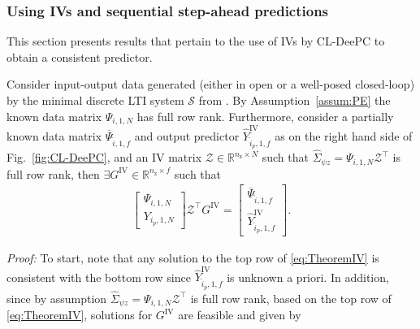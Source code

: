 \subsubsection{Using \ac{IVs} and sequential step-ahead predictions}\label{sec:Theorem1}
\noindent This section presents results that pertain to the use of \ac{IVs} by \ac{CL-DeePC} to obtain a consistent predictor.%
%
\setcounter{thm}{0}
\begin{lem}\label{lem:main_1}
    Consider input-output data generated (either in open or a well-posed closed-loop) by the minimal discrete \ac{LTI} system $\mathcal{S}$ from . By Assumption~\ref{assum:PE} the known data matrix $\Psi_{i,1,N}$ has full row rank. Furthermore, consider a partially known data matrix $\overline{\Psi}_{\hat{i},1,f}$ and output predictor $\widehat{Y}_{\hat{i}_p,1,f}^\mathrm{IV}$ as on the right hand side of Fig.~\ref{fig:CL-DeePC}, and an \acs{IV} matrix $\mathcal{Z}\in\mathbb{R}^{n_\mathrm{z}\times N}$ such that $\hat{\Sigma}_{\psi z}=\Psi_{i,1,N}\mathcal{Z}^\top$ is full row rank, %
    then $\exists G^\mathrm{IV}\in\mathbb{R}^{n_\mathrm{z}\times f}$ such that
    \begin{align}\label{eq:TheoremIV}
        \begin{bmatrix}
            \Psi_{i,1,N}\\Y_{i_p,1,N}
        \end{bmatrix}\mathcal{Z}^\top G^\mathrm{IV} =
        \begin{bmatrix}
            \overline{\Psi}_{\hat{i},1,f}\\\widehat{Y}_{\hat{i}_p,1,f}^\mathrm{IV}
        \end{bmatrix}.
    \end{align}
\end{lem}
\noindent\textit{Proof:} To start, note that any solution to the top row of \eqref{eq:TheoremIV} is consistent with the bottom row since $\widehat{Y}_{\hat{i}_p,1,f}^\mathrm{IV}$ is unknown a priori. In addition, since by assumption $\hat{\Sigma}_{\psi z}=\Psi_{i,1,N}\mathcal{Z}^\top$ is full row rank, based on the top row of \eqref{eq:TheoremIV}, solutions for $G^\mathrm{IV}$ are feasible and given by
